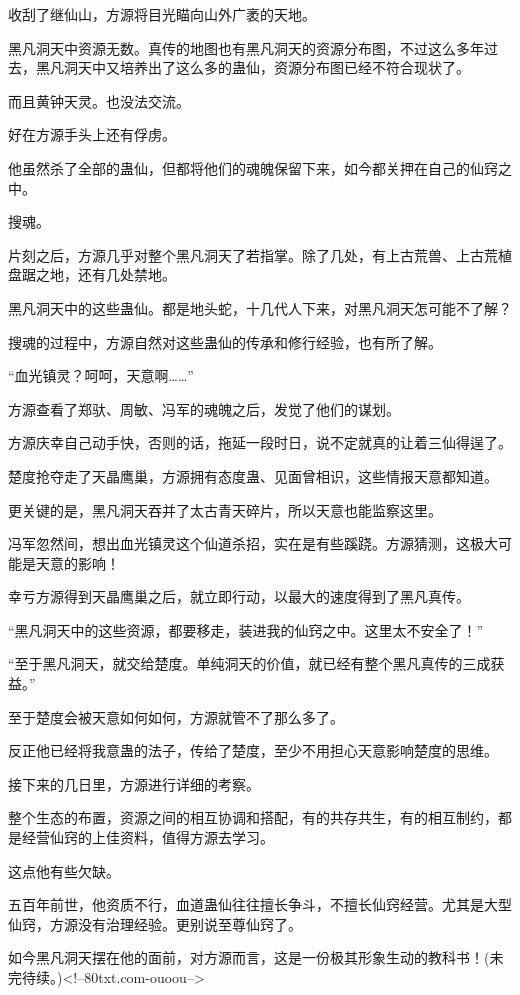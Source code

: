 \begin{this_body}
收刮了继仙山，方源将目光瞄向山外广袤的天地。

黑凡洞天中资源无数。真传的地图也有黑凡洞天的资源分布图，不过这么多年过去，黑凡洞天中又培养出了这么多的蛊仙，资源分布图已经不符合现状了。

而且黄钟天灵。也没法交流。

好在方源手头上还有俘虏。

他虽然杀了全部的蛊仙，但都将他们的魂魄保留下来，如今都关押在自己的仙窍之中。

搜魂。

片刻之后，方源几乎对整个黑凡洞天了若指掌。除了几处，有上古荒兽、上古荒植盘踞之地，还有几处禁地。

黑凡洞天中的这些蛊仙。都是地头蛇，十几代人下来，对黑凡洞天怎可能不了解？

搜魂的过程中，方源自然对这些蛊仙的传承和修行经验，也有所了解。

“血光镇灵？呵呵，天意啊……”

方源查看了郑驮、周敏、冯军的魂魄之后，发觉了他们的谋划。

方源庆幸自己动手快，否则的话，拖延一段时日，说不定就真的让着三仙得逞了。

楚度抢夺走了天晶鹰巢，方源拥有态度蛊、见面曾相识，这些情报天意都知道。

更关键的是，黑凡洞天吞并了太古青天碎片，所以天意也能监察这里。

冯军忽然间，想出血光镇灵这个仙道杀招，实在是有些蹊跷。方源猜测，这极大可能是天意的影响！

幸亏方源得到天晶鹰巢之后，就立即行动，以最大的速度得到了黑凡真传。

“黑凡洞天中的这些资源，都要移走，装进我的仙窍之中。这里太不安全了！”

“至于黑凡洞天，就交给楚度。单纯洞天的价值，就已经有整个黑凡真传的三成获益。”

至于楚度会被天意如何如何，方源就管不了那么多了。

反正他已经将我意蛊的法子，传给了楚度，至少不用担心天意影响楚度的思维。

接下来的几日里，方源进行详细的考察。

整个生态的布置，资源之间的相互协调和搭配，有的共存共生，有的相互制约，都是经营仙窍的上佳资料，值得方源去学习。

这点他有些欠缺。

五百年前世，他资质不行，血道蛊仙往往擅长争斗，不擅长仙窍经营。尤其是大型仙窍，方源没有治理经验。更别说至尊仙窍了。

如今黑凡洞天摆在他的面前，对方源而言，这是一份极其形象生动的教科书！(未完待续。)<!--80txt.com-ouoou-->

\end{this_body}

